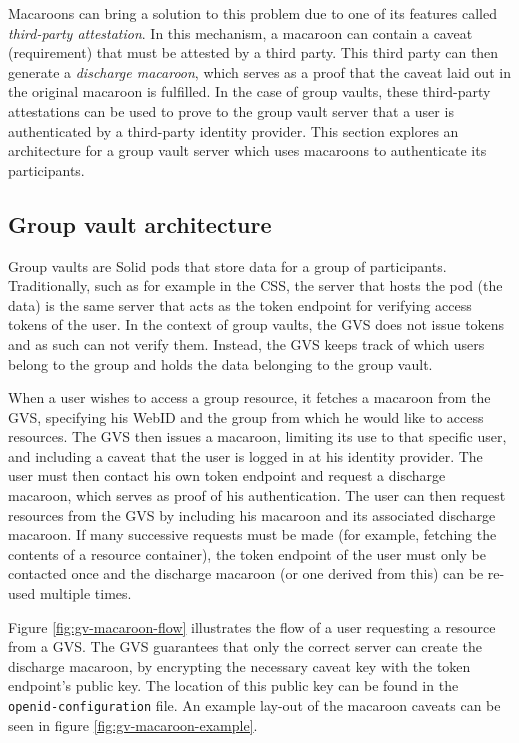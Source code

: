 \noindent Macaroons \citep{macaroons} can bring a solution to this problem due to one of its features called \textit{third-party attestation}. In this mechanism, a macaroon can contain a caveat (requirement) that must be attested by a third party. This third party can then generate a \textit{discharge macaroon}, which serves as a proof that the caveat laid out in the original macaroon is fulfilled. In the case of group vaults, these third-party attestations can be used to prove to the group vault server that a user is authenticated by a third-party identity provider. This section explores an architecture for a group vault server which uses macaroons to authenticate its participants.

\subsection{Group vault architecture}
Group vaults are Solid pods that store data for a group of participants. Traditionally, such as for example in the \acrlong{CSS}, the server that hosts the pod (the data) is the same server that acts as the token endpoint for verifying access tokens of the user. In the context of group vaults, the \gls{GVS} does not issue tokens and as such can not verify them. Instead, the \gls{GVS} keeps track of which users belong to the group and holds the data belonging to the group vault.

When a user wishes to access a group resource, it fetches a macaroon from the \gls{GVS}, specifying his WebID and the group from which he would like to access resources. The \gls{GVS} then issues a macaroon, limiting its use to that specific user, and including a caveat that the user is logged in at his identity provider. The user must then contact his own token endpoint and request a discharge macaroon, which serves as proof of his authentication. The user can then request resources from the \gls{GVS} by including his macaroon and its associated discharge macaroon. If many successive requests must be made (for example, fetching the contents of a resource container), the token endpoint of the user must only be contacted once and the discharge macaroon (or one derived from this) can be re-used multiple times. 

Figure \ref{fig:gv-macaroon-flow} illustrates the flow of a user requesting a resource from a \gls{GVS}. The \gls{GVS} guarantees that only the correct server can create the discharge macaroon, by encrypting the necessary caveat key with the token endpoint's public key. The location of this public key can be found in the \texttt{openid-configuration} file. An example lay-out of the macaroon caveats can be seen in figure \ref{fig:gv-macaroon-example}.

